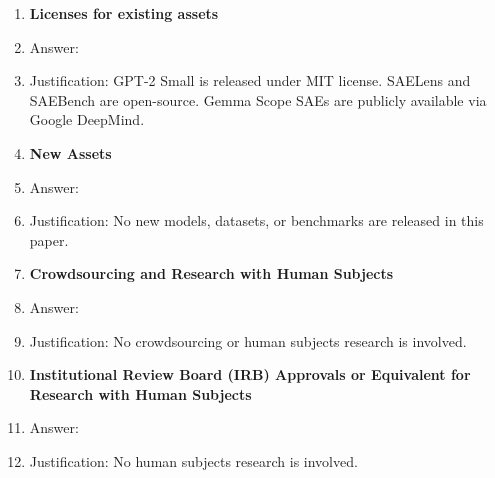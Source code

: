 \documentclass{article}
\begin{document}
\begin{enumerate}
\item {\bf Licenses for existing assets}
    \item[] Answer: \answerYes{}
    \item[] Justification: GPT-2 Small is released under MIT license. SAELens and SAEBench are open-source. Gemma Scope SAEs are publicly available via Google DeepMind.

\item {\bf New Assets}
    \item[] Answer: \answerNA{}
    \item[] Justification: No new models, datasets, or benchmarks are released in this paper.

\item {\bf Crowdsourcing and Research with Human Subjects}
    \item[] Answer: \answerNA{}
    \item[] Justification: No crowdsourcing or human subjects research is involved.

\item {\bf Institutional Review Board (IRB) Approvals or Equivalent for Research with Human Subjects}
    \item[] Answer: \answerNA{}
    \item[] Justification: No human subjects research is involved.

\end{enumerate}
\end{document}
